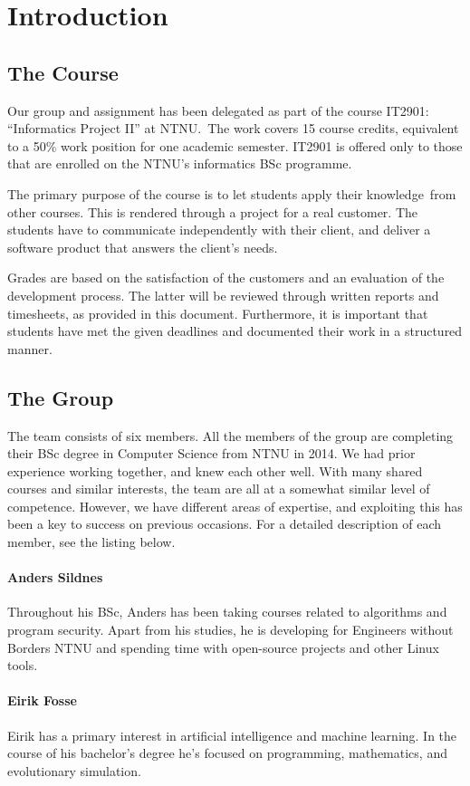 \chapter{Introduction}
\section{The Course}\label{section:course}
Our group and assignment has been delegated as part of the course
IT2901: ``Informatics Project II''
at NTNU.\ The work covers 15 course credits, equivalent to a 50\% work
position for one academic semester. IT2901 is offered only to those
that are enrolled on the NTNU's informatics BSc
programme.

The primary purpose of the course is to let students apply their
knowledge\ from other courses. This is rendered through a project for a
real customer. The students have to communicate independently with
their client, and deliver a software product that answers the
client's needs. 

Grades are based on the satisfaction of the customers and an evaluation
of the development process. The latter will be reviewed through written
reports and timesheets, as provided in this document. Furthermore, it
is important that students have met the given deadlines and documented
their work in a structured manner.

\section{The Group}
The team consists of six members. All the members of the group are
completing their BSc degree in Computer Science from NTNU in 2014. We
had prior experience working together, and knew each other well. With
many shared courses and similar interests, the team are all at a
somewhat similar level of competence. However, we have different areas
of expertise, and exploiting this has been a key to success on previous
occasions. For a detailed description of each member, see the listing
below.

\subsubsection*{Anders Sildnes}
Throughout his BSc, Anders has been taking courses related to algorithms
and program security. Apart from his studies, he is developing for
Engineers without Borders NTNU and spending time with open-source
projects and other Linux tools.

\subsubsection{Eirik Fosse}
Eirik has a primary interest in artificial intelligence and machine
learning. In the course of his bachelor's degree
he's focused on programming, mathematics, and
evolutionary simulation.

